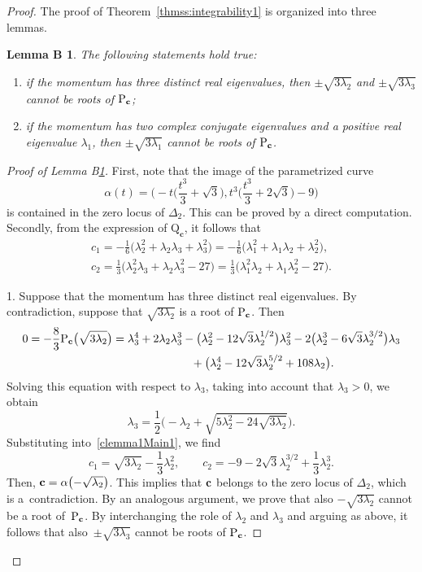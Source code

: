 \documentclass[pdftex]{sigma}
\numberwithin{equation}{section}
\newtheorem{lemmaB}{Lemma B\ignorespaces}
\begin{document}
\begin{proof} The proof of Theorem~\ref{thmss:integrability1} is organized into three lemmas.

\begin{lemmaB}\label{lemma1Main1}
The following statements hold true:
\begin{enumerate}\itemsep=0pt
\item[$(1)$] if the momentum has three distinct real eigenvalues, then $\pm \sqrt{3\lambda_2}$ and $\pm\sqrt{3\lambda_3}$
cannot be roots of ${\rm P}_{{\bf c}}$;
\item[$(2)$] if the momentum has two complex conjugate eigenvalues and a positive real eigenvalue $\lambda_1$, then $\pm \sqrt{3\lambda_1}$ cannot be roots of ${\rm P}_{{\bf c}}$.
\end{enumerate}
\end{lemmaB}

\begin{proof}[Proof of Lemma B\ref{lemma1Main1}]
First, note that the image of the parametrized curve
\[
 \alpha(t)=\biggl(-t\bigg(\frac{t^3}{3}+\sqrt{3}\bigg),t^3\bigg(\frac{t^3}{3}+2\sqrt{3}\bigg)-9\biggr)
\]
is contained in the zero locus of $\Delta_2$. This can be proved by a direct computation. Secondly,
from the expression of $\mathrm{Q}_\mathbf{c}$, it follows that
\begin{gather}
c_1=-\frac{1}{6}\big(\lambda_2^2+\lambda_2\lambda_3+\lambda_3^2\big)=-\frac{1}{6}\big(\lambda_1^2+\lambda_1\lambda_2+\lambda_2^2\big), \nonumber\\
 c_2=\frac{1}{3}\big(\lambda_2^2\lambda_3+\lambda_2\lambda_3^2-27\big)=\frac{1}{3}\big(\lambda_1^2\lambda_2+\lambda_1\lambda_2^2-27\big).\label{clemma1Main1}
 \end{gather}

1. Suppose that the momentum has three distinct real eigenvalues.
By contradiction, suppose that $\sqrt{3\lambda_2}$ is a root of ${\rm P}_{{\bf c}}$. Then
\begin{gather*}
0=-\frac{8}{3}{\rm P}_{{\bf c}}\big(\sqrt{3\lambda_2}\big) =\lambda_3^4+2\lambda_2\lambda_3^3-\big(\lambda_2^2-12\sqrt{3}\lambda_2^{1/2}\big)\lambda_3^2-2\big(\lambda_2^3-6\sqrt{3}\lambda_2^{3/2}\big)\lambda_3\\
\hphantom{0=-\frac{8}{3}{\rm P}_{{\bf c}}\big(\sqrt{3\lambda_2}\big) =}{}
+\big(\lambda_2^4-12\sqrt{3}\lambda_2^{5/2}+108\lambda_2\big).
\end{gather*}
Solving this equation with respect to $\lambda_3$, {taking into account that $\lambda_3>0$}, we obtain
\[
 \lambda_3=\frac{1}{2}\biggl(-\lambda_2+\sqrt{5\lambda_2^2-24\sqrt{3\lambda_2}}\biggr).
\]
Substituting into~\eqref{clemma1Main1}, we find
\[
 c_1=\sqrt{3\lambda_2}-\frac{1}{3}\lambda_2^2,\qquad c_2=-9-2\sqrt{3}\lambda_2^{3/2}+\frac{1}{3}\lambda_2^3.
\]
Then, ${\bf c}=\alpha\bigl(-\sqrt{\lambda_2}\bigr)$. This implies that ${\bf c}$ belongs to the zero locus of $\Delta_2$,
which is a~contradiction.
By an analogous argument, we prove that also $-\sqrt{3\lambda_2}$ cannot be a root of~${\rm P}_{{\bf c}}$.
By interchanging the role of $\lambda_2$ and $\lambda_3$ and arguing as above, it follows that
also~$\pm\sqrt{3\lambda_3}$ cannot be roots of ${\rm P}_{{\bf c}}$.


\end{proof}
\end{proof}
\end{document}
